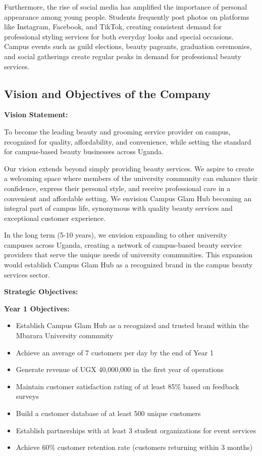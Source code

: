 Furthermore, the rise of social media has amplified the importance of personal appearance among young people. Students frequently post photos on platforms like Instagram, Facebook, and TikTok, creating consistent demand for professional styling services for both everyday looks and special occasions. Campus events such as guild elections, beauty pageants, graduation ceremonies, and social gatherings create regular peaks in demand for professional beauty services.

\subsection{Vision and Objectives of the Company}

\textbf{Vision Statement:}

To become the leading beauty and grooming service provider on campus, recognized for quality, affordability, and convenience, while setting the standard for campus-based beauty businesses across Uganda.

Our vision extends beyond simply providing beauty services. We aspire to create a welcoming space where members of the university community can enhance their confidence, express their personal style, and receive professional care in a convenient and affordable setting. We envision Campus Glam Hub becoming an integral part of campus life, synonymous with quality beauty services and exceptional customer experience.

In the long term (5-10 years), we envision expanding to other university campuses across Uganda, creating a network of campus-based beauty service providers that serve the unique needs of university communities. This expansion would establish Campus Glam Hub as a recognized brand in the campus beauty services sector.

\textbf{Strategic Objectives:}

\textbf{Year 1 Objectives:}
\begin{itemize}[leftmargin=2em]
    \item Establish Campus Glam Hub as a recognized and trusted brand within the Mbarara University community
    \item Achieve an average of 7 customers per day by the end of Year 1
    \item Generate revenue of UGX 40,000,000 in the first year of operations
    \item Maintain customer satisfaction rating of at least 85\% based on feedback surveys
    \item Build a customer database of at least 500 unique customers
    \item Establish partnerships with at least 3 student organizations for event services
    \item Achieve 60\% customer retention rate (customers returning within 3 months)
\end{itemize}

